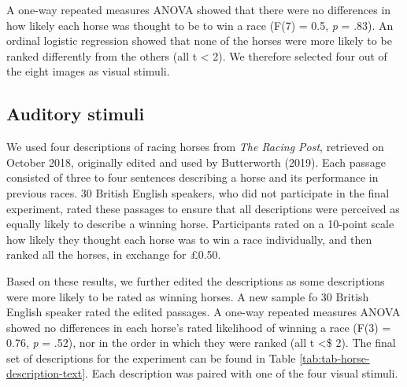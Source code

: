 \documentclass[
  man,floatsintext]{apa7}
\begin{document}
A one-way repeated measures ANOVA showed that there were no differences in how likely each horse was thought to be to win a race (F(7) = 0.5, \emph{p} = .83). An ordinal logistic regression showed that none of the horses were more likely to be ranked differently from the others (all \textbar t\textbar{} \textless{} 2). We therefore selected four out of the eight images as visual stimuli.

\hypertarget{auditory-stimuli}{%
\subsection{Auditory stimuli}\label{auditory-stimuli}}

We used four descriptions of racing horses from \emph{The Racing Post}, retrieved on October 2018, originally edited and used by Butterworth (2019). Each passage consisted of three to four sentences describing a horse and its performance in previous races. 30 British English speakers, who did not participate in the final experiment, rated these passages to ensure that all descriptions were perceived as equally likely to describe a winning horse. Participants rated on a 10-point scale how likely they thought each horse was to win a race individually, and then ranked all the horses, in exchange for £0.50.

Based on these results, we further edited the descriptions as some descriptions were more likely to be rated as winning horses. A new sample fo 30 British English speaker rated the edited passages. A one-way repeated measures ANOVA showed no differences in each horse's rated likelihood of winning a race (F(3) = 0.76, \emph{p} = .52), nor in the order in which they were ranked (all \textbar t\textbar{} \textless\$ 2). The final set of descriptions for the experiment can be found in Table \ref{tab:tab-horse-description-text}. Each description was paired with one of the four visual stimuli.
\end{document}
